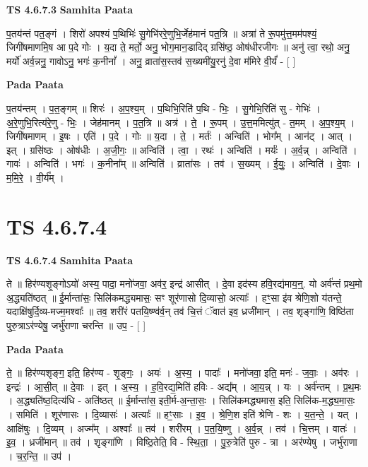 \documentclass[17pt]{extarticle}
\begin{document}
\textbf{TS 4.6.7.3 } \newline
\textbf{Samhita Paata} \newline

प॒तय॑न्तं पत॒ङ्गं । शिरो॑ अपश्यं प॒थिभिः॑ सु॒गेभि॑ररे॒णुभि॒र्जेह॑मानं पत॒त्रि ॥ अत्रा॑ ते रू॒पमु॑त्त॒मम॑पश्यं॒ जिगी॑षमाणमि॒ष आ प॒दे गोः । य॒दा ते॒ मर्तो॒ अनु॒ भोग॒मान॒डादिद् ग्रसि॑ष्ठ॒ ओष॑धीरजीगः ॥ अनु॑ त्वा॒ रथो॒ अनु॒ मर्यो॑ अर्व॒न्ननु॒ गावोऽनु॒ भगः॑ क॒नीनां᳚ । अनु॒ व्राता॑स॒स्तव॑ स॒ख्यमी॑यु॒रनु॑ दे॒वा म॑मिरे वी॒र्यं॑ - [  ] \newline

\textbf{Pada Paata} \newline

प॒तय॑न्तम् । प॒त॒ङ्गम् ॥ शिरः॑ । अ॒प॒श्य॒म् । प॒थिभि॒रिति॑ प॒थि - भिः॒ । सु॒गेभि॒रिति॑ सु - गेभिः॑ । अ॒रे॒णुभि॒रित्य॑रे॒णु - भिः॒ । जेह॑मानम् । प॒त॒त्रि ॥ अत्र॑ । ते॒ । रू॒पम् । उ॒त्त॒ममित्यु॑त् - त॒मम् । अ॒प॒श्य॒म् । जिगी॑षमाणम् । इ॒षः । एति॑ । प॒दे । गोः ॥ य॒दा । ते॒ । मर्तः॑ । अन्विति॑ । भोग᳚म् । आन॑ट् । आत् । इत् । ग्रसि॑ष्ठः । ओष॑धीः । अ॒जी॒गः॒ ॥ अन्विति॑ । त्वा॒ । रथः॑ । अन्विति॑ । मर्यः॑ । अ॒र्व॒न्न् । अन्विति॑ । गावः॑ । अन्विति॑ । भगः॑ । क॒नीना᳚म् ॥ अन्विति॑ । व्राता॑सः । तव॑ । स॒ख्यम् । ई॒युः॒ । अन्विति॑ । दे॒वाः । म॒मि॒रे॒ । वी॒र्य᳚म् ।  \newline




\section*{ TS 4.6.7.4 }

\textbf{TS 4.6.7.4 } \newline
\textbf{Samhita Paata} \newline

ते ॥ हिर॑ण्यशृ॒ङ्गोऽयो॑ अस्य॒ पादा॒ मनो॑जवा॒ अव॑र॒ इन्द्र॑ आसीत् । दे॒वा इद॑स्य हवि॒रद्य॑माय॒न्॒. यो अर्व॑न्तं प्रथ॒मो अ॒द्ध्यति॑ष्ठत् ॥ ई॒र्मान्ता॑सः॒ सिलि॑कमद्ध्यमासः॒ सꣳ शूर॑णासो दि॒व्यासो॒ अत्याः᳚ । हꣳ॒॒सा इ॑व श्रेणि॒शो य॑तन्ते॒ यदाक्षि॑षुर्दि॒व्य-मज्म॒मश्वाः᳚ ॥ तव॒ शरी॑रं पतयि॒ष्ण्व॑र्व॒न् तव॑ चि॒त्तं ॅवात॑ इव॒ ध्रजी॑मान् । तव॒ शृङ्गा॑णि॒ विष्ठि॑ता पुरु॒त्राऽर॑ण्येषु॒ जर्भु॑राणा चरन्ति ॥ उप॒ - [  ] \newline

\textbf{Pada Paata} \newline

ते॒ ॥ हिर॑ण्यशृङ्ग॒ इति॒ हिर॑ण्य - शृ॒ङ्गः॒ । अयः॑ । अ॒स्य॒ । पादाः᳚ । मनो॑जवा॒ इति॒ मनः॑ - ज॒वाः॒ । अव॑रः । इन्द्रः॑ । आ॒सी॒त् ॥ दे॒वाः । इत् । अ॒स्य॒ । ह॒वि॒रद्य॒मिति॑ हविः - अद्य᳚म् । आ॒य॒न्न् । यः । अर्व॑न्तम् । प्र॒थ॒मः । अ॒द्ध्यति॑ष्ठ॒दित्य॑धि - अति॑ष्ठत् ॥ ई॒र्मान्ता॑स॒ इती॒र्म-अ॒न्ता॒सः॒ । सिलि॑कमद्ध्यमास॒ इति॒ सिलि॑क-म॒द्ध्य॒मा॒सः॒ । समिति॑ । शूर॑णासः । दि॒व्यासः॑ । अत्याः᳚ ॥ हꣳ॒॒साः । इ॒व॒ । श्रे॒णि॒श इति॑ श्रेणि - शः । य॒त॒न्ते॒ । यत् । आक्षि॑षुः । दि॒व्यम् । अज्म᳚म् । अश्वाः᳚ ॥ तव॑ । शरी॑रम् । प॒त॒यि॒ष्णु । अ॒र्व॒न्न् । तव॑ । चि॒त्तम् । वातः॑ । इ॒व॒ । ध्रजी॑मान् ॥ तव॑ । शृङ्गा॑णि । विष्ठि॒तेति॒ वि - स्थि॒ता॒ । पु॒रु॒त्रेति॑ पुरु - त्रा । अर॑ण्येषु । जर्भु॑राणा । च॒र॒न्ति॒ ॥ उप॑ ।  \newline
\end{document}
